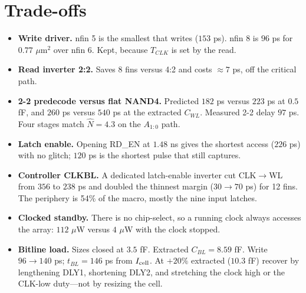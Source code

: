 \documentclass[10pt,letterpaper]{article}
\begin{document}
\section*{Trade-offs}
\begin{itemize}\setlength{\itemsep}{2pt}
\item \textbf{Write driver.} nfin 5 is the smallest that writes ($153$ ps). nfin 8 is $96$ ps for $0.77$ $\mu$m$^2$ over nfin 6. Kept, because $T_{CLK}$ is set by the read.
\item \textbf{Read inverter 2:2.} Saves 8 fins versus 4:2 and costs $\approx7$ ps, off the critical path.
\item \textbf{2-2 predecode versus flat NAND4.} Predicted $182$ ps versus $223$ ps at $0.5$ fF, and $260$ ps versus $540$ ps at the extracted $C_{WL}$. Measured 2-2 delay $97$ ps. Four stages match $\hat N=4.3$ on the $A_{1:0}$ path.
\item \textbf{Latch enable.} Opening RD\_EN at $1.48$ ns gives the shortest access ($226$ ps) with no glitch; $120$ ps is the shortest pulse that still captures.
\item \textbf{Controller CLKBL.} A dedicated latch-enable inverter cut CLK$\to$WL from $356$ to $238$ ps and doubled the thinnest margin ($30\to70$ ps) for 12 fins. The periphery is 54\% of the macro, mostly the nine input latches.
\item \textbf{Clocked standby.} There is no chip-select, so a running clock always accesses the array: $112$ $\mu$W versus $4$ $\mu$W with the clock stopped.
\item \textbf{Bitline load.} Sizes closed at $3.5$ fF. Extracted $C_{BL}=8.59$ fF. Write $96\to140$ ps; $t_{BL}=146$ ps from $I_{\rm cell}$. At $+20\%$ extracted ($10.3$ fF) recover by lengthening DLY1, shortening DLY2, and stretching the clock high or the CLK-low duty---not by resizing the cell.
\end{itemize}
\end{document}
